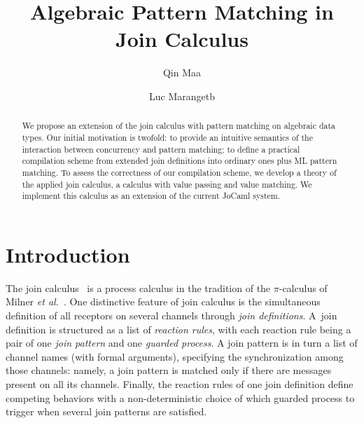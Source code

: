 \documentclass{LMCS}
\makeatletter
\newcommand{\etal}{\emph{et al.}\@\xspace}
\newcommand{\jocaml}{\textrm{JoCaml}\xspace}
\renewcommand{\_}{\mathord{\rule[-.25ex]{1ex}{.15ex}}}
\makeatother
\begin{document}
\title{Algebraic Pattern Matching in Join Calculus\rsuper *}

\author[Q.~Ma]{Qin Ma\rsuper a}
\address{{\lsuper a}OFFIS, Escherweg 2, 26121 Oldenburg, Germany}

\author[L.~Maranget]{Luc Maranget\rsuper b}
\address{{\lsuper b}INRIA-Rocquencourt, BP 105, 78153 Le Chesnay Cedex, France}



\begin{abstract}
We propose an extension of the join calculus with pattern matching on
  algebraic data types. Our initial motivation is twofold: to provide an
  intuitive semantics of the interaction between concurrency and pattern
  matching; to define a practical compilation scheme from extended join
  definitions into ordinary ones plus ML pattern matching. To assess the
  correctness of our compilation scheme, we develop a theory of the applied
  join calculus, a calculus with value passing and value matching. We
  implement this calculus as an extension of the current \jocaml system.
\end{abstract}

\maketitle



\section{Introduction}


\label{sec.intro}

The join calculus~\cite{Fournet98:PhD,FournetGonthier96} is a process
calculus in the tradition of the $\pi$-calculus of Milner
\etal~\cite{MPW92}. One distinctive feature of join calculus is the
simultaneous definition of all receptors on several channels through
\emph{join definitions}. A~join definition is structured as a list of
\emph{reaction rules}, with each reaction rule being a pair of one
\emph{join pattern} and one \emph{guarded process}. A join pattern is
in turn a list of channel names (with formal arguments), specifying
the synchronization among those channels: namely, a join pattern is
matched only if there are messages present on all its channels.
Finally, the reaction rules of one join definition define competing
behaviors with a non-deterministic choice of which guarded process to
trigger when several join patterns are satisfied.
\end{document}
